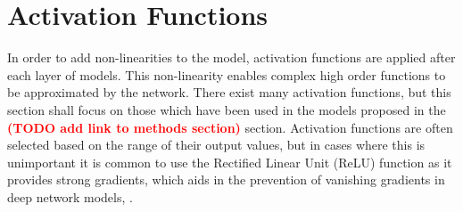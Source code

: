\section{Activation Functions}
In order to add non-linearities to the model, activation functions are applied after each layer of models.
This non-linearity enables complex high order functions to be approximated by the network.
There exist many activation functions, but this section shall focus on those which have been used in the models proposed in the \textcolor{red}{\textbf{(TODO add link to methods section)}} section.
Activation functions are often selected based on the range of their output values, but in cases where this is unimportant it is common to use the Rectified Linear Unit (ReLU) function as it provides strong gradients, which aids in the prevention of vanishing gradients in deep network models, \cite{Goodfellow-et-al-2016}.


